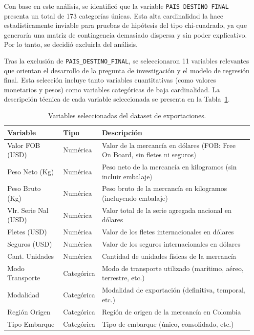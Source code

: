 \documentclass[12pt]{article}
\begin{document}
Con base en este análisis, se identificó que la variable
\texttt{PAIS\_DESTINO\_FINAL} presenta un total de 173 categorías
únicas. Esta alta cardinalidad la hace estadísticamente inviable para
pruebas de hipótesis del tipo chi-cuadrado, ya que generaría una matriz
de contingencia demasiado dispersa y sin poder explicativo. Por lo tanto,
se decidió excluirla del análisis.

Tras la exclusión de \texttt{PAIS\_DESTINO\_FINAL}, se seleccionaron
11 variables relevantes que orientan el desarrollo de la pregunta de
investigación y el modelo de regresión final. Esta selección incluye
tanto variables cuantitativas (como valores monetarios y pesos) como
variables categóricas de baja cardinalidad. La descripción técnica de
cada variable seleccionada se presenta en la Tabla~\ref{tab:variables}.

\begin{table}[htbp]
    \centering
    \caption{Variables seleccionadas del dataset de exportaciones.}
    \label{tab:variables}
    \small
    \begin{tabular}{>{\raggedright\arraybackslash}p{3.2cm}>{\raggedright\arraybackslash}p{1.9cm}>{\raggedright\arraybackslash}p{8.9cm}}
        \toprule
        Variable & Tipo & Descripción \\
        \midrule
        Valor FOB (USD) & Numérica & Valor de la mercancía en dólares (FOB: Free On Board, sin fletes ni seguros) \\
        Peso Neto (Kg) & Numérica & Peso neto de la mercancía en kilogramos (sin incluir embalaje) \\
        Peso Bruto (Kg) & Numérica & Peso bruto de la mercancía en kilogramos (incluyendo embalaje) \\
        Vlr. Serie Nal (USD) & Numérica & Valor total de la serie agregada nacional en dólares \\
        Fletes (USD) & Numérica & Valor de los fletes internacionales en dólares \\
        Seguros (USD) & Numérica & Valor de los seguros internacionales en dólares \\
        Cant. Unidades & Numérica & Cantidad de unidades físicas de la mercancía \\
        Modo Transporte & Categórica & Modo de transporte utilizado (marítimo, aéreo, terrestre, etc.) \\
        Modalidad & Categórica & Modalidad de exportación (definitiva, temporal, etc.) \\
        Región Origen & Categórica & Región de origen de la mercancía en Colombia \\
        Tipo Embarque & Categórica & Tipo de embarque (único, consolidado, etc.) \\
        \bottomrule
    \end{tabular}
\end{table}
\FloatBarrier
\end{document}
